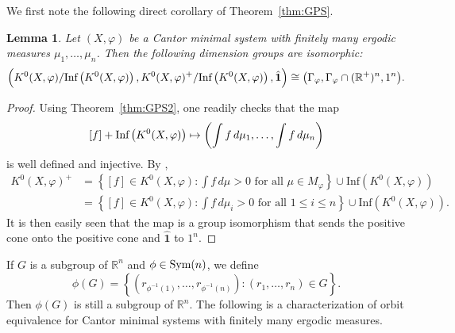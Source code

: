 \documentclass{amsart}
\newtheorem{lemma}[theorem]{Lemma}
\theoremstyle{definition}
\theoremstyle{problem}
\theoremstyle{remark}
\numberwithin{equation}{section}
\begin{document}
We first note the following direct corollary of Theorem~\ref{thm:GPS}.

\begin{lemma}\label{lem:dim} Let $(X, \varphi)$ be a Cantor minimal system with finitely many ergodic measures $\mu_1,\dots, \mu_n$. Then the following dimension groups are isomorphic:
$$ \Bigl(K^0(X, \varphi)/\mbox{\rm Inf}\left(K^0(X,\varphi)\right), K^0(X, \varphi)^+/\mbox{\rm Inf}\left(K^0(X, \varphi)\right), \hat{\mathbf 1}\Bigr)\cong \bigl(\Gamma_\varphi, \Gamma_\varphi\cap (\mathbb{R}^+)^n, 1^n\bigr). $$
\end{lemma}

\begin{proof}
 Using Theorem~\ref{thm:GPS2}, one readily checks that the map
$$ [f]+\mbox{\rm Inf}\left(K^0(X, \varphi)\right)\mapsto \left(\int f\,d\mu_1,\dots , \int f\,d\mu_n\right) $$
is well defined and injective. 
By \cite[Theorem 1.13]{GPS},
\begin{align*}
K^0(X,\varphi)^+ &
=\left\{[f]\in K^0(X,\varphi)\colon \int f\,d\mu>0 \mbox{ for all }  \mu \in M_{\varphi}\right\}\cup\mbox{Inf}\left(K^0(X,\varphi)\right)\\
& =\left\{[f]\in K^0(X,\varphi)\colon \int f\,d\mu_i> 0 \mbox{ for all }  1\leq i\leq n \right\}\cup\mbox{Inf}\left(K^0(X,\varphi)\right).
\end{align*}
It is then easily seen that the map is a group isomorphism that sends the positive cone onto the positive cone and $\hat{\mathbf 1}$ to $1^n$. 
\end{proof}

If $G$ is  a subgroup of $\mathbb R^n$ and $\phi\in \mbox{\rm Sym}(n)$, we define
$$ \phi(G)=\left\{(r_{\phi^{-1}(1)}, \dots, r_{\phi^{-1}(n)})\colon (r_1, \dots, r_n)\in G\right\}. $$
Then $\phi(G)$ is still a subgroup of $\mathbb{R}^n$. The following is a characterization of orbit equivalence for Cantor minimal systems with finitely many ergodic measures.
\end{document}
